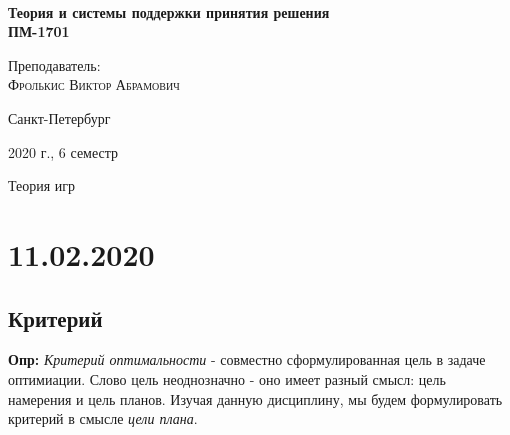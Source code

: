 \documentclass[aps,%
12pt,%
final,%
oneside,
onecolumn,%
musixtex, %
superscriptaddress,%
centertags]{article} %
\begin{document}
\begin{titlepage} 
\begin{center}
 
\textbf{}\\[10.0cm]
\textbf{\LARGE Теория и системы поддержки принятия решения}\\[0.5cm]
\textbf{\Large ПМ-1701} \\[0.1cm]

\begin{center} \large
{Преподаватель:} \\[0.5cm]
\textsc {Фролькис Виктор Абрамович}\\
\end{center}
\vfill 

{\large {Санкт-Петербург}} \par
{\large {2020 г., 6 семестр}}
\end{center} 
\end{titlepage}

\begin{thebibliography}{3}
Теория игр
\end{thebibliography}
\tableofcontents
\newpage

\section{11.02.2020}
\subsection{Критерий}
\textbf{Опр:} \textit{Критерий оптимальности} - совместно сформулированная цель в задаче оптимиации. Слово цель неоднозначно - оно имеет разный смысл: цель намерения и цель планов.
Изучая данную дисциплину, мы будем формулировать критерий в смысле \textit{цели плана}. 
\end{document}
